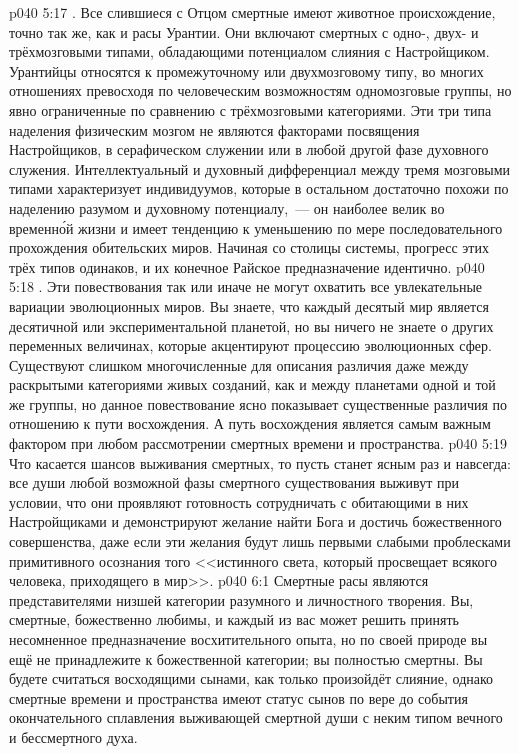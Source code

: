 \vs p040 5:17 \pc {}. Все слившиеся с Отцом смертные имеют животное происхождение, точно так же, как и расы Урантии. Они включают смертных с одно\hyp{}, двух\hyp{} и трёхмозговыми типами, обладающими потенциалом слияния с Настройщиком. Урантийцы относятся к промежуточному или двухмозговому типу, во многих отношениях превосходя по человеческим возможностям одномозговые группы, но явно ограниченные по сравнению с трёхмозговыми категориями. Эти три типа наделения физическим мозгом не являются факторами посвящения Настройщиков, в серафическом служении или в любой другой фазе духовного служения. Интеллектуальный и духовный дифференциал между тремя мозговыми типами характеризует индивидуумов, которые в остальном достаточно похожи по наделению разумом и духовному потенциалу,~--- он наиболее велик во временн\'ой жизни и имеет тенденцию к уменьшению по мере последовательного прохождения обительских миров. Начиная со столицы системы, прогресс этих трёх типов одинаков, и их конечное Райское предназначение идентично.
\vs p040 5:18 \pc {}. Эти повествования так или иначе не могут охватить все увлекательные вариации эволюционных миров. Вы знаете, что каждый десятый мир является десятичной или экспериментальной планетой, но вы ничего не знаете о других переменных величинах, которые акцентируют процессию эволюционных сфер. Существуют слишком многочисленные для описания различия даже между раскрытыми категориями живых созданий, как и между планетами одной и той же группы, но данное повествование ясно показывает существенные различия по отношению к пути восхождения. А путь восхождения является самым важным фактором при любом рассмотрении смертных времени и пространства.
\vs p040 5:19 \pc Что касается шансов выживания смертных, то пусть станет ясным раз и навсегда: все души любой возможной фазы смертного существования выживут при условии, что они проявляют готовность сотрудничать с обитающими в них Настройщиками и демонстрируют желание найти Бога и достичь божественного совершенства, даже если эти желания будут лишь первыми слабыми проблесками примитивного осознания того <<истинного света, который просвещает всякого человека, приходящего в мир>>.
\vs p040 6:1 Смертные расы являются представителями низшей категории разумного и личностного творения. Вы, смертные, божественно любимы, и каждый из вас может решить принять несомненное предназначение восхитительного опыта, но по своей природе вы ещё не принадлежите к божественной категории; вы полностью смертны. Вы будете считаться восходящими сынами, как только произойдёт слияние, однако смертные времени и пространства имеют статус сынов по вере до события окончательного сплавления выживающей смертной души с неким типом вечного и бессмертного духа.
